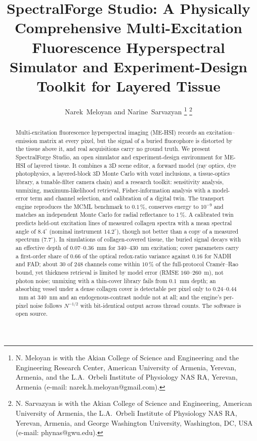 \documentclass[journal]{IEEEtran}
\begin{document}
\title{SpectralForge Studio: A Physically Comprehensive Multi-Excitation Fluorescence Hyperspectral Simulator and Experiment-Design Toolkit for Layered Tissue}
\author{Narek~Meloyan and Narine~Sarvazyan%
\thanks{N. Meloyan is with the Akian College of Science and Engineering and the Engineering Research Center, American University of Armenia, Yerevan, Armenia, and the L.A.\ Orbeli Institute of Physiology NAS RA, Yerevan, Armenia (e-mail: narek.h.meloyan@gmail.com).}%
\thanks{N. Sarvazyan is with the Akian College of Science and Engineering, American University of Armenia, the L.A.\ Orbeli Institute of Physiology NAS RA, Yerevan, Armenia, and George Washington University, Washington, DC, USA (e-mail: phynas@gwu.edu).}}
\maketitle

\begin{abstract}
Multi-excitation fluorescence hyperspectral imaging (ME-HSI) records an excitation--emission matrix at every pixel, but the signal of a buried fluorophore is distorted by the tissue above it, and real acquisitions carry no ground truth. We present SpectralForge Studio, an open simulator and experiment-design environment for ME-HSI of layered tissue. It combines a 3D scene editor, a forward model (ray optics, dye photophysics, a layered-block 3D Monte Carlo with voxel inclusions, a tissue-optics library, a tunable-filter camera chain) and a research toolkit: sensitivity analysis, unmixing, maximum-likelihood retrieval, Fisher-information analysis with a model-error term and channel selection, and calibration of a digital twin. The transport engine reproduces the MCML benchmark to $0.1\,\%$, conserves energy to $10^{-9}$ and matches an independent Monte Carlo for radial reflectance to $1\,\%$. A calibrated twin predicts held-out excitation lines of measured collagen spectra with a mean spectral angle of $8.4^\circ$ (nominal instrument $14.2^\circ$), though not better than a copy of a measured spectrum ($7.7^\circ$). In simulations of collagen-covered tissue, the buried signal decays with an effective depth of $0.07$--$0.36$~mm for 340--430~nm excitation; cover parameters carry a first-order share of $0.66$ of the optical redox-ratio variance against $0.16$ for NADH and FAD; about 30 of 248 channels come within $10\,\%$ of the full-protocol Cram\'er--Rao bound, yet thickness retrieval is limited by model error (RMSE $160$--$260$~\textmu m), not photon noise; unmixing with a thin-cover library fails from $0.1$~mm depth; an absorbing vessel under a dense collagen cover is detectable per pixel only to $0.24$--$0.44$~mm at 340~nm and an endogenous-contrast nodule not at all; and the engine's per-pixel noise follows $N^{-1/2}$ with bit-identical output across thread counts. The software is open source.
\end{abstract}
\end{document}
